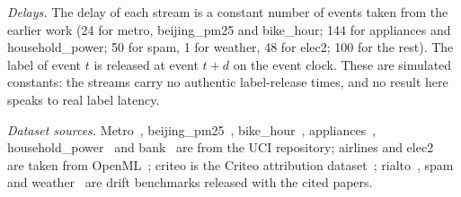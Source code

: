 \documentclass[10pt]{article}
\theoremstyle{plain}
\theoremstyle{definition}
\begin{document}
\emph{Delays.} The delay of each stream is a constant number of events taken from the earlier work (24 for metro, beijing\_pm25 and bike\_hour; 144 for appliances and household\_power; 50 for spam, 1 for weather, 48 for elec2; 100 for the rest). The label of event $t$ is released at event $t+d$ on the event clock. These are simulated constants: the streams carry no authentic label-release times, and no result here speaks to real label latency.

\emph{Dataset sources.} Metro~\citep{uci_metro}, beijing\_pm25~\citep{uci_beijing}, bike\_hour~\citep{uci_bike}, appliances~\citep{uci_appliances}, household\_power~\citep{uci_household} and bank~\citep{uci_bank} are from the UCI repository; airlines and elec2~\citep{harries1999splice} are taken from OpenML~\citep{vanschoren2014openml}; criteo is the Criteo attribution dataset~\citep{diemert2017attribution}; rialto~\citep{losing2016knn}, spam~\citep{katakis2010tracking} and weather~\citep{elwell2011incremental} are drift benchmarks released with the cited papers.

\begin{table}[!htbp]
\caption{Provenance for the 14 cached streams. LR = logistic regression; HGB = histogram gradient boosting. For the seven atlas streams, model descriptions follow the construction script accompanying the byte-identical cached loss files from an earlier registered run.}\label{tab:streamprov}
\centering\small

\end{table}

\begin{table}[!htbp]
\caption{Cached-loss summary for the 14 streams. Episodes are blocks of 2{,}000 events (\NStreamEpisodes{} in total); delays are simulated constants. Error columns give mean 0/1 loss across all events and episodes; disagreement is the fraction of events where the two losses differ (the exposure rate $r$); the final column states which model has lower mean loss. Rates are displayed to three decimals.}\label{tab:streams}
\centering\small

\end{table}
\end{document}

